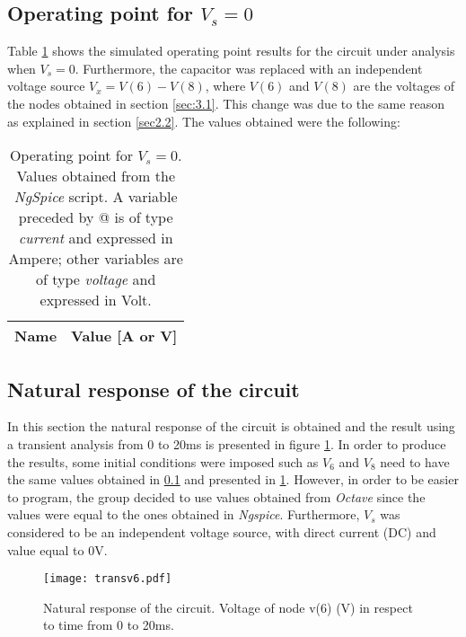 \subsection{Operating point for $V_s=0$}
\label{sec:3.2}

Table \ref{op:tab_5} shows the simulated operating point results for the circuit under analysis when $V_s=0$. Furthermore, the capacitor was replaced with an independent voltage source $V_x=V(6)-V(8)$, where $V(6)$ and $V(8)$ are the voltages of the nodes obtained in section \ref{sec:3.1}. This change was due to the same reason as explained in section \ref{sec2.2}.
The values obtained were the following:

\begin{table}[h]
  \centering
  \def\arraystretch{1.2}
 
\begin{tabular}{c|c}
    \hline    
    \textbf{Name} & \textbf{Value [A or V]} \\ \hline
    
    \hline
  \end{tabular}
  \captionsetup{justification=centering, margin=2cm}
  \caption{Operating point for $V_s=0$. Values obtained from the \emph{NgSpice} script. A variable preceded by @ is of type {\em current} and expressed in Ampere; other variables are of type {\it voltage} and expressed in Volt.}
  \label{op:tab_5}
\end{table}
\FloatBarrier

\clearpage
\subsection{Natural response of the circuit}
\label{sec:3.3}

In this section the natural response of the circuit is obtained and the result using a transient analysis from 0 to 20ms is presented in figure \ref{transv6}. In order to produce the results, some initial conditions were imposed such as $V_6$ and $V_8$ need to have the same values obtained in \ref{sec:3.2} and presented in \ref{op:tab_5}. However, in order to be easier to program, the group decided to use values obtained from \emph{Octave} since the values were equal to the ones obtained in \emph{Ngspice}. Furthermore, $V_s$ was considered to be an independent voltage source, with direct current (DC) and value equal to 0V.

\begin{figure}[!htp] \centering
\texttt{[image: transv6.pdf]}
\captionsetup{justification=centering, margin=2cm}
\caption{Natural response of the circuit. Voltage of node v(6) (V) in respect to time from 0 to 20ms.}
\label{transv6}
\end{figure}
\FloatBarrier

